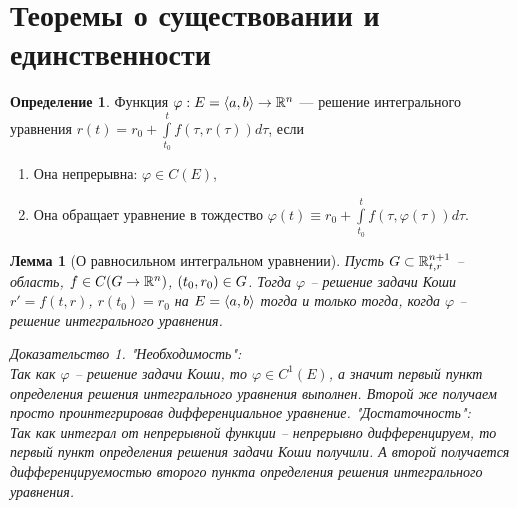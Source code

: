 \documentclass[a5paper, 10pt]{article}
\theoremstyle{definition}
\newtheorem{Def}{Определение}
\theoremstyle{plain}
\newtheorem{Lem}{Лемма}
\theoremstyle{remark}
\newtheorem*{Proof}{Доказательство}
\begin{document}
	\section[Существование и единственность]{Теоремы о существовании и единственности}
	\begin{Def}
		Функция $\varphi: E=\left\langle a,b\right\rangle \rightarrow \mathbb{R}^n$ --- решение интегрального уравнения $r(t) = r_0 + \int\limits_{t_0}^t f(\tau, r(\tau))d\tau$, если
		\begin{enumerate}
			\item Она непрерывна: $\varphi \in C(E)$,
			\item Она обращает уравнение в тождество $\varphi(t) \equiv r_0 + \int\limits_{t_0}^t f(\tau, \varphi(\tau))d\tau$.
		\end{enumerate}
	\end{Def}
	\begin{Lem}[О равносильном интегральном уравнении]
		Пусть $G \subset \mathbb{R}^{n+1}_{t,r}$ -- область, $f \in C(G \rightarrow \mathbb{R}^n)$, $\left(t_0, r_0\right) \in G$.
		Тогда $\varphi$ -- решение задачи Коши $r'=f(t,r)$, $r(t_0)=r_0$ на $E=\left\langle a,b\right\rangle$ тогда и только тогда, когда $\varphi$ -- решение интегрального уравнения.
		\begin{Proof}
			"Необходимость":\\
			Так как $\varphi$ -- решение задачи Коши, то $\varphi \in C^1(E)$, а значит первый пункт определения решения интегрального уравнения выполнен. Второй же получаем просто проинтегрировав дифференциальное уравнение.
			"Достаточность":\\
			Так как интеграл от непрерывной функции -- непрерывно дифференцируем, то первый пункт определения решения задачи Коши получили. А второй получается дифференцируемостью второго пункта определения решения интегрального уравнения. 
		\end{Proof}
	\end{Lem}
\end{document}
